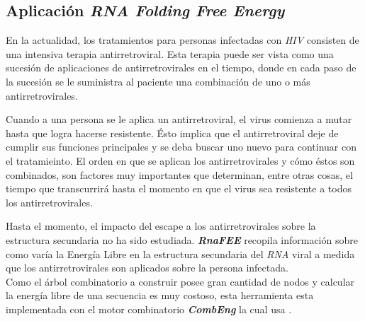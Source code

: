\subsection{Aplicación \textit{RNA Folding Free Energy}}

En la actualidad, los tratamientos para personas infectadas con \textit{HIV} consisten de una intensiva terapia antirretroviral. Esta
terapia puede ser vista como una sucesión de aplicaciones de antirretrovirales en el tiempo, donde en cada paso de la sucesión se le
suministra al paciente una combinación de uno o más antirretrovirales.

Cuando a una persona se le aplica un antirretroviral, el virus comienza a mutar hasta que logra hacerse resistente. Ésto implica que el
antirretroviral deje de cumplir sus funciones principales y se deba buscar uno nuevo para continuar con el tratamieinto. El orden en que se
aplican los antirretrovirales y cómo éstos son combinados, son factores muy importantes que determinan, entre otras cosas, el tiempo que
transcurrirá hasta el momento en que el virus sea resistente a todos los antirretrovirales.

Hasta el momento, el impacto del escape a los antirretrovirales sobre la estructura secundaria no ha sido estudiada.
\textit{\textbf{RnaFEE}} recopila información sobre como varía la Energía Libre en la estructura secundaria del \textit{RNA} viral a medida
que los antirretrovirales son aplicados sobre la persona infectada.\\

Como el árbol combinatorio a construir posee gran cantidad de nodos y calcular la energía libre de una secuencia es muy costoso, esta
herramienta esta implementada con el motor combinatorio \textit{\textbf{CombEng}} la cual usa \rc{}.
